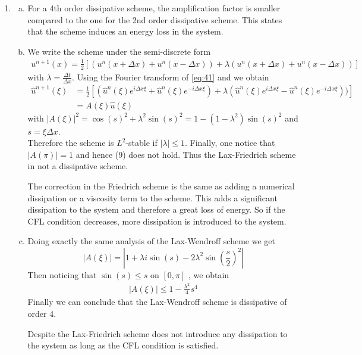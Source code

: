 \documentclass[10pt,a4paper,twoside, french]{article}
\numberwithin{equation}{section}
\numberwithin{figure}{section}
\numberwithin{table}{section}
\newcommand{\chap}[1]{\widehat{#1}}
\begin{document}
\begin{enumerate}
\begin{enumerate}[a.]
\end{enumerate}


\setcounter{section}{4}
\item  \begin{enumerate}[a.]
\item For a 4th order dissipative scheme, the amplification factor is smaller compared to the one for the 2nd order dissipative scheme. This states that the scheme induces an energy loss in the system. 
\item We write the scheme under the semi-discrete form
\begin{align}
u^{n+1}(x) = \frac{1}{2} \left[(u^n(x+\Delta x) +u^n(x-\Delta x)) + \lambda(u^n(x+\Delta x) +u^n(x-\Delta x))\right] 
\label{eq:41}
\end{align}
with $\lambda=\frac{\Delta t }{\Delta x}$. Using the Fourier transform of \ref{eq:41} and we obtain
\begin{align*}
\chap{u}^{n+1}(\xi)  & = \frac{1}{2} \left[(\chap{u}^n(\xi)e^{i\Delta x \xi} +\chap{u}^n(\xi)e^{-i\Delta x \xi}) 
+ \lambda(\chap{u}^n(\xi)e^{i\Delta x \xi} -\chap{u}^n(\xi)e^{-i\Delta x \xi}) )\right] \\
 & = A(\xi)\chap{u}(\xi)
\end{align*}
with $|A(\xi)|^2 = \cos(s)^2 +\lambda^2 \sin(s)^2 = 1-(1-\lambda^2)\sin(s)^2$ and $s=\xi \Delta x$.\\
Therefore the scheme is $L^2$-stable if $|\lambda | \leq 1$. Finally, one notice that $|A(\pi)| =1$ and hence (9) does not hold. Thus the Lax-Friedrich scheme in not a dissipative scheme. 

The correction in the Friedrich scheme is the same as adding a numerical dissipation or a viscosity term to the scheme. This adds a significant dissipation to the system and therefore a great loss of energy. So if the CFL condition decreases, more dissipation is introduced to the system.\\


\item Doing exactly the same analysis of the Lax-Wendroff scheme we get 
$$ |A(\xi)| = |1+\lambda i \sin(s) - 2\lambda^2 \sin(\frac{s}{2})^2 | $$
Then noticing that $ \sin(s)\leq s$ on $[0,\pi]$ , we obtain
\begin{align*}
|A(\xi)|  \leq 1-\frac{\lambda^2}{4} s^4 
\end{align*}
Finally we can conclude that the Lax-Wendroff scheme is dissipative of order 4.

Despite the Lax-Friedrich scheme does not introduce any dissipation to the system as long as the CFL condition is satisfied.


\end{enumerate}
\end{enumerate}
\end{document}
